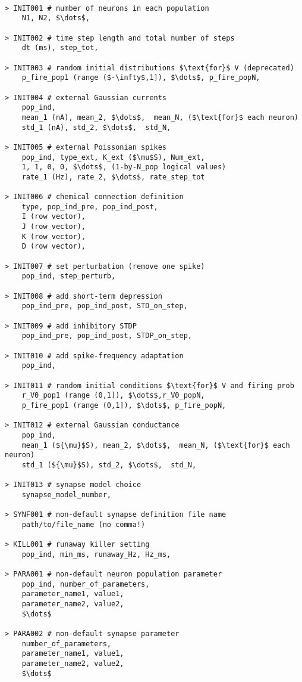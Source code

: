 \documentclass{article}
\begin{document}
\begin{lstlisting}[mathescape]

> INIT001 # number of neurons in each population
	N1, N2, $\dots$,

> INIT002 # time step length and total number of steps
	dt (ms), step_tot,

> INIT003 # random initial distributions $\text{for}$ V (deprecated)
	p_fire_pop1 (range ($-\infty$,1]), $\dots$, p_fire_popN, 

> INIT004 # external Gaussian currents
	pop_ind, 
	mean_1 (nA), mean_2, $\dots$,  mean_N, ($\text{for}$ each neuron)
	std_1 (nA), std_2, $\dots$,  std_N, 

> INIT005 # external Poissonian spikes
	pop_ind, type_ext, K_ext ($\mu$S), Num_ext,
	1, 1, 0, 0, $\dots$, (1-by-N_pop logical values)
	rate_1 (Hz), rate_2, $\dots$, rate_step_tot

> INIT006 # chemical connection definition
	type, pop_ind_pre, pop_ind_post,
	I (row vector),
	J (row vector),
	K (row vector),
	D (row vector),

> INIT007 # set perturbation (remove one spike)
	pop_ind, step_perturb,

> INIT008 # add short-term depression
	pop_ind_pre, pop_ind_post, STD_on_step,

> INIT009 # add inhibitory STDP
	pop_ind_pre, pop_ind_post, STDP_on_step,
	
> INIT010 # add spike-frequency adaptation 
	pop_ind,

> INIT011 # random initial conditions $\text{for}$ V and firing prob
	r_V0_pop1 (range (0,1]), $\dots$,r_V0_popN, 
	p_fire_pop1 (range (0,1]), $\dots$, p_fire_popN, 

> INIT012 # external Gaussian conductance
	pop_ind, 
	mean_1 (${\mu}$S), mean_2, $\dots$,  mean_N, ($\text{for}$ each neuron)
	std_1 (${\mu}$S), std_2, $\dots$,  std_N, 

> INIT013 # synapse model choice
	synapse_model_number,

> SYNF001 # non-default synapse definition file name
	path/to/file_name (no comma!)

> KILL001 # runaway killer setting
	pop_ind, min_ms, runaway_Hz, Hz_ms,

> PARA001 # non-default neuron population parameter
	pop_ind, number_of_parameters,
	parameter_name1, value1,
	parameter_name2, value2,
	$\dots$
 
> PARA002 # non-default synapse parameter
	number_of_parameters,
	parameter_name1, value1,
	parameter_name2, value2,
	$\dots$


\end{lstlisting}
\end{document}
